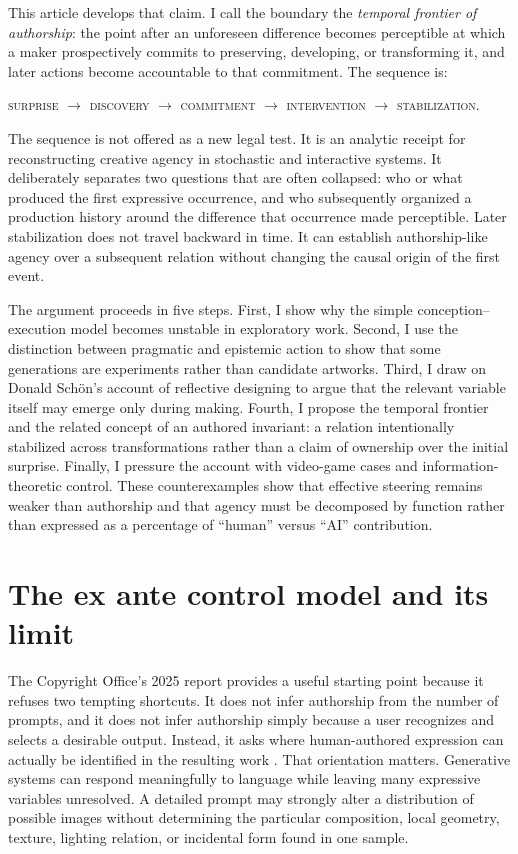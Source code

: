 \documentclass[11pt]{article}
\newcommand{\term}[1]{\textsc{#1}}
\begin{document}
This article develops that claim. I call the boundary the \emph{temporal frontier of authorship}: the point after an unforeseen difference becomes perceptible at which a maker prospectively commits to preserving, developing, or transforming it, and later actions become accountable to that commitment. The sequence is:

\begin{center}
\term{surprise $\rightarrow$ discovery $\rightarrow$ commitment $\rightarrow$ intervention $\rightarrow$ stabilization}.
\end{center}

The sequence is not offered as a new legal test. It is an analytic receipt for reconstructing creative agency in stochastic and interactive systems. It deliberately separates two questions that are often collapsed: who or what produced the first expressive occurrence, and who subsequently organized a production history around the difference that occurrence made perceptible. Later stabilization does not travel backward in time. It can establish authorship-like agency over a subsequent relation without changing the causal origin of the first event.

The argument proceeds in five steps. First, I show why the simple conception--execution model becomes unstable in exploratory work. Second, I use the distinction between pragmatic and epistemic action to show that some generations are experiments rather than candidate artworks. Third, I draw on Donald Sch\"on's account of reflective designing to argue that the relevant variable itself may emerge only during making. Fourth, I propose the temporal frontier and the related concept of an authored invariant: a relation intentionally stabilized across transformations rather than a claim of ownership over the initial surprise. Finally, I pressure the account with video-game cases and information-theoretic control. These counterexamples show that effective steering remains weaker than authorship and that agency must be decomposed by function rather than expressed as a percentage of ``human'' versus ``AI'' contribution.

\section{The ex ante control model and its limit}

The Copyright Office's 2025 report provides a useful starting point because it refuses two tempting shortcuts. It does not infer authorship from the number of prompts, and it does not infer authorship simply because a user recognizes and selects a desirable output. Instead, it asks where human-authored expression can actually be identified in the resulting work \citep{USCO2025Copyrightability}. That orientation matters. Generative systems can respond meaningfully to language while leaving many expressive variables unresolved. A detailed prompt may strongly alter a distribution of possible images without determining the particular composition, local geometry, texture, lighting relation, or incidental form found in one sample.
\end{document}
